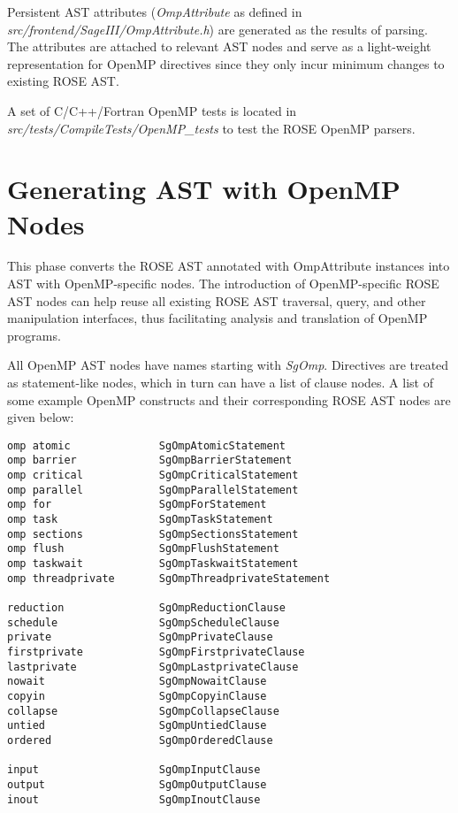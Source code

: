Persistent AST attributes (\emph{OmpAttribute} as defined in
\textit{src/frontend/SageIII/OmpAttribute.h}) are generated as the results
of parsing.
The attributes are attached to relevant AST nodes and serve as a light-weight representation for OpenMP directives
since they only incur minimum changes to existing ROSE AST.

A set of C/C++/Fortran OpenMP tests is located in \textit{src/tests/CompileTests/OpenMP\_tests} to test the ROSE OpenMP parsers.
\section{Generating AST with OpenMP Nodes}
This phase converts the ROSE AST annotated with OmpAttribute instances into
AST with OpenMP-specific nodes.
The introduction of OpenMP-specific ROSE AST nodes can help reuse all
existing ROSE AST traversal, query, and other manipulation interfaces, thus
facilitating analysis and translation of OpenMP programs.

All OpenMP AST nodes have names starting with \textit{SgOmp}. 
Directives are treated as statement-like nodes, which in turn can have a list of clause nodes.
A list of some example OpenMP constructs and their corresponding ROSE AST nodes are given below:

{\scriptsize
\begin{verbatim}
omp atomic              SgOmpAtomicStatement
omp barrier             SgOmpBarrierStatement
omp critical            SgOmpCriticalStatement
omp parallel            SgOmpParallelStatement
omp for                 SgOmpForStatement
omp task                SgOmpTaskStatement
omp sections            SgOmpSectionsStatement
omp flush               SgOmpFlushStatement
omp taskwait            SgOmpTaskwaitStatement
omp threadprivate       SgOmpThreadprivateStatement

reduction               SgOmpReductionClause
schedule                SgOmpScheduleClause
private                 SgOmpPrivateClause
firstprivate            SgOmpFirstprivateClause
lastprivate             SgOmpLastprivateClause
nowait                  SgOmpNowaitClause
copyin                  SgOmpCopyinClause
collapse                SgOmpCollapseClause
untied                  SgOmpUntiedClause
ordered                 SgOmpOrderedClause

input                   SgOmpInputClause
output                  SgOmpOutputClause
inout                   SgOmpInoutClause
\end{verbatim}
}
 
